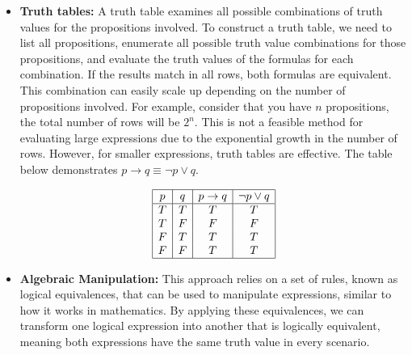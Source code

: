 \begin{itemize}
    \item \textbf{Truth tables:} A truth table examines all possible combinations of truth values for the propositions involved. To construct a truth table, we need to list all propositions, enumerate all possible truth value combinations for those propositions, and evaluate the truth values of the formulas for each combination. If the results match in all rows, both formulas are equivalent. This combination can easily scale up depending on the number of propositions involved. For example, consider that you have \( n \) propositions, the total number of rows will be \( 2^n \). This is not a feasible method for evaluating large expressions due to the exponential growth in the number of rows. 
    However, for smaller expressions, truth tables are effective. The table below demonstrates \( p \to q \equiv \lnot p \lor q \).
    
    \[
\begin{array}{|c|c|c|c|}
\hline
p & q & p \to q & \lnot p \lor q \\
\hline
T & T & T & T \\
T & F & F & F \\
F & T & T & T \\
F & F & T & T \\
\hline
\end{array}
\]

    \item \textbf{Algebraic Manipulation:} This approach relies on a set of rules, known as logical equivalences, that can be used to manipulate expressions, similar to how it works in mathematics. By applying these equivalences, we can transform one logical expression into another that is logically equivalent, meaning both expressions have the same truth value in every scenario.  
    

\end{itemize}
